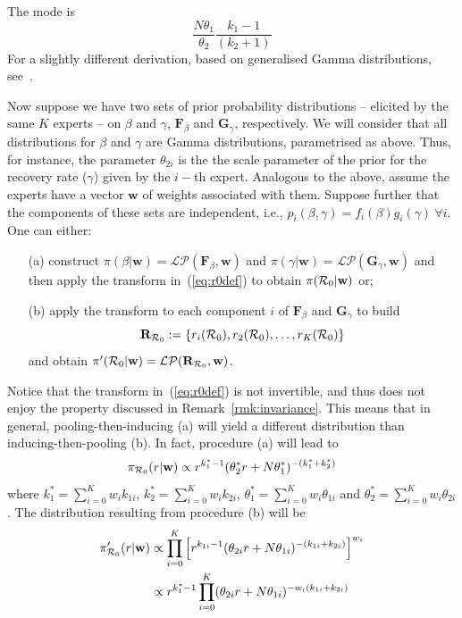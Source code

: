 \documentclass[11pt]{article}
\begin{document}
The mode is 
\begin{equation}
\label{eq:mode}
\frac{N\theta_1}{\theta_2}\frac{k_1 - 1}{(k_2 + 1)}
\end{equation}
For a slightly different derivation, based on generalised Gamma distributions, see~\cite{Coelho2007}.

Now suppose we have two sets of prior probability distributions -- elicited by the same $K$ experts -- on $\beta$ and $\gamma$, $\mathbf{F}_\beta$ and $\mathbf{G}_\gamma$, respectively.
We will consider that all distributions for $\beta$ and $\gamma$ are Gamma distributions, parametrised as above.
Thus, for instance, the parameter $\theta_{2i}$ is the the scale parameter of the prior for the recovery rate ($\gamma$) given by the $i-$th expert.
Analogous to the above, assume the experts have a vector $\mathbf{w}$ of weights associated with them.
Suppose further that the components of these sets are independent, i.e., $p_i(\beta, \gamma) = f_i(\beta)g_i(\gamma)\: \forall i$.
One can either:
\begin{itemize}
 \item[(a)] construct $\pi(\beta | \mathbf{w}) = \mathcal{LP}(\mathbf{F}_\beta, \mathbf{w})$ and $\pi(\gamma | \mathbf{w}) = \mathcal{LP}(\mathbf{G}_\gamma, \mathbf{w})$ and then apply the transform in~(\ref{eq:r0def}) to obtain $\pi({\cal R}_0| \mathbf{w})$ or;
 \item[(b)] apply the transform to each component $i$ of $\mathbf{F}_\beta$ and $\mathbf{G}_\gamma$ to build
 \[\mathbf{R}_{{\cal R}_0}:= \{r_i({\cal R}_0), r_2({\cal R}_0), \ldots, r_K({\cal R}_0)\} \]
 and obtain $\pi^{\prime}({\cal R}_0|  \mathbf{w}) = \mathcal{LP}(\mathbf{R}_{{\cal R}_0},  \mathbf{w})$.
\end{itemize}
Notice that the transform in~(\ref{eq:r0def}) is not invertible, and thus does not enjoy the property discussed in Remark~\ref{rmk:invariance}.
This means that in general, pooling-then-inducing (a) will yield a different distribution than inducing-then-pooling (b).
In fact, procedure (a) will lead to
\begin{equation}
 \pi_{{\cal R}_0}(r| \mathbf{w}) \propto   r^{k_{1}^{\ast}-1} (\theta_{2}^{\ast} r + N\theta_{1}^{\ast})^{-(k_{1}^{\ast} + k_{2}^{\ast})}
\end{equation}
where $k_{1}^{\ast} = \sum_{i=0}^K w_ik_{1i}$,  $k_{2}^{\ast} = \sum_{i=0}^K w_ik_{2i}$,  $\theta_{1}^{\ast} = \sum_{i=0}^K w_i\theta_{1i}$ and  $\theta_{2}^{\ast} = \sum_{i=0}^K w_i\theta_{2i}$.
The distribution resulting from procedure (b) will be 
\begin{align}
  \pi^{\prime}_{{\cal R}_0}(r| \mathbf{w}) &\propto   \prod_{i=0}^K \left[ r^{k_{1i}-1} (\theta_{2i} r + N\theta_{1i})^{-(k_{1i} + k_{2i})} \right]^{w_i} \\
   &\propto r^{k_{1}^{\ast}-1}  \prod_{i=0}^K (\theta_{2i} r + N\theta_{1i})^{-w_{i}(k_{1i} + k_{2i})}
\end{align}
\end{document}
